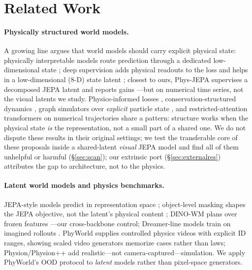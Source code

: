 \section{Related Work}
\label{sec:related}

\paragraph{Physically structured world models.}
A growing line argues that world models should carry explicit physical state: physically interpretable models route prediction through a dedicated low-dimensional state \citep{mao2024piwm,peper2025principles}; deep supervision adds physical readouts to the loss and helps in a low-dimensional ($8$-D) state latent \citep{zahorodnii2025deepsup}; closest to ours, Phys-JEPA supervises a decomposed JEPA latent and reports gains \citep{nie2026physjepa}---but on numerical time series, not the visual latents we study. Physics-informed losses \citep{raissi2019pinn}, conservation-structured dynamics \citep{greydanus2019hamiltonian,cranmer2020lnn}, graph simulators over \emph{explicit} particle state \citep{battaglia2016interaction,sanchez2020gns}, and restricted-attention transformers on numerical trajectories \citep{liu2026kepler} share a pattern: structure works when the physical state \emph{is} the representation, not a small part of a shared one. We do not dispute these results in their original settings; we test the transferable core of these proposals inside a shared-latent \emph{visual} JEPA model and find all of them unhelpful or harmful (\S\ref{sec:scan}); our extrinsic port (\S\ref{sec:externalres}) attributes the gap to architecture, not to the physics.

\paragraph{Latent world models and physics benchmarks.}
JEPA-style models predict in representation space \citep{assran2023ijepa,bardes2024vjepa,balestriero2025lejepa,maes2025lewm}; object-level masking shapes the JEPA objective, not the latent's physical content \citep{nam2026causaljepa}; DINO-WM plans over frozen features \citep{zhou2025dinowm,oquab2024dinov2}---our cross-backbone control; Dreamer-line models train on imagined rollouts \citep{ha2018world,hafner2023dreamer}. PhyWorld \citep{kang2025how} supplies controlled physics videos with explicit ID ranges, showing scaled video generators memorize cases rather than laws; Physion/Physion++ \citep{bear2021physion,tung2023physionpp} add realistic---not camera-captured---simulation. We apply PhyWorld's OOD protocol to \emph{latent} models rather than pixel-space generators.

